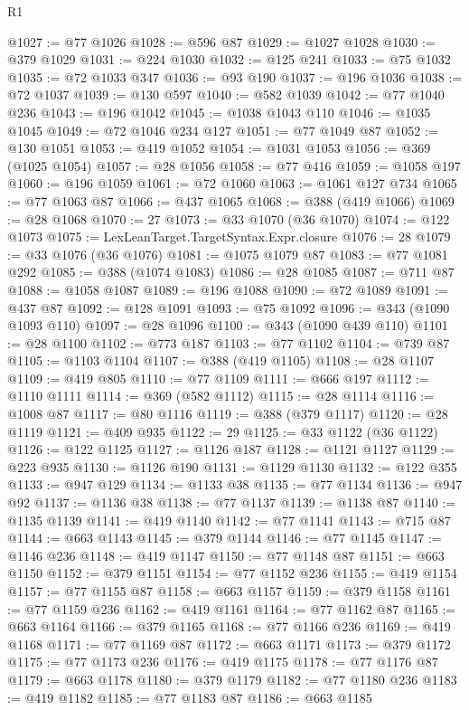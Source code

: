\begin{lexlean}{R1}
\begin{coremodule}
@1027 := @77 @1026
@1028 := @596 @87
@1029 := @1027 @1028
@1030 := @379 @1029
@1031 := @224 @1030
@1032 := @125 @241
@1033 := @75 @1032
@1035 := @72 @1033 @347
@1036 := @93 @190
@1037 := @196 @1036
@1038 := @72 @1037
@1039 := @130 @597
@1040 := @582 @1039
@1042 := @77 @1040 @236
@1043 := @196 @1042
@1045 := @1038 @1043 @110
@1046 := @1035 @1045
@1049 := @72 @1046 @234 @127
@1051 := @77 @1049 @87
@1052 := @130 @1051
@1053 := @419 @1052
@1054 := @1031 @1053
@1056 := @369 (@1025 @1054)
@1057 := @28 @1056
@1058 := @77 @416
@1059 := @1058 @197
@1060 := @196 @1059
@1061 := @72 @1060
@1063 := @1061 @127 @734
@1065 := @77 @1063 @87
@1066 := @437 @1065
@1068 := @388 (@419 @1066)
@1069 := @28 @1068
@1070 := 27
@1073 := @33 @1070 (@36 @1070)
@1074 := @122 @1073
@1075 := LexLeanTarget.TargetSyntax.Expr.closure
@1076 := 28
@1079 := @33 @1076 (@36 @1076)
@1081 := @1075 @1079 @87
@1083 := @77 @1081 @292
@1085 := @388 (@1074 @1083)
@1086 := @28 @1085
@1087 := @711 @87
@1088 := @1058 @1087
@1089 := @196 @1088
@1090 := @72 @1089
@1091 := @437 @87
@1092 := @128 @1091
@1093 := @75 @1092
@1096 := @343 (@1090 @1093 @110)
@1097 := @28 @1096
@1100 := @343 (@1090 @439 @110)
@1101 := @28 @1100
@1102 := @773 @187
@1103 := @77 @1102
@1104 := @739 @87
@1105 := @1103 @1104
@1107 := @388 (@419 @1105)
@1108 := @28 @1107
@1109 := @419 @805
@1110 := @77 @1109
@1111 := @666 @197
@1112 := @1110 @1111
@1114 := @369 (@582 @1112)
@1115 := @28 @1114
@1116 := @1008 @87
@1117 := @80 @1116
@1119 := @388 (@379 @1117)
@1120 := @28 @1119
@1121 := @409 @935
@1122 := 29
@1125 := @33 @1122 (@36 @1122)
@1126 := @122 @1125
@1127 := @1126 @187
@1128 := @1121 @1127
@1129 := @223 @935
@1130 := @1126 @190
@1131 := @1129 @1130
@1132 := @122 @355
@1133 := @947 @129
@1134 := @1133 @38
@1135 := @77 @1134
@1136 := @947 @92
@1137 := @1136 @38
@1138 := @77 @1137
@1139 := @1138 @87
@1140 := @1135 @1139
@1141 := @419 @1140
@1142 := @77 @1141
@1143 := @715 @87
@1144 := @663 @1143
@1145 := @379 @1144
@1146 := @77 @1145
@1147 := @1146 @236
@1148 := @419 @1147
@1150 := @77 @1148 @87
@1151 := @663 @1150
@1152 := @379 @1151
@1154 := @77 @1152 @236
@1155 := @419 @1154
@1157 := @77 @1155 @87
@1158 := @663 @1157
@1159 := @379 @1158
@1161 := @77 @1159 @236
@1162 := @419 @1161
@1164 := @77 @1162 @87
@1165 := @663 @1164
@1166 := @379 @1165
@1168 := @77 @1166 @236
@1169 := @419 @1168
@1171 := @77 @1169 @87
@1172 := @663 @1171
@1173 := @379 @1172
@1175 := @77 @1173 @236
@1176 := @419 @1175
@1178 := @77 @1176 @87
@1179 := @663 @1178
@1180 := @379 @1179
@1182 := @77 @1180 @236
@1183 := @419 @1182
@1185 := @77 @1183 @87
@1186 := @663 @1185

\end{coremodule}
\end{lexlean}
